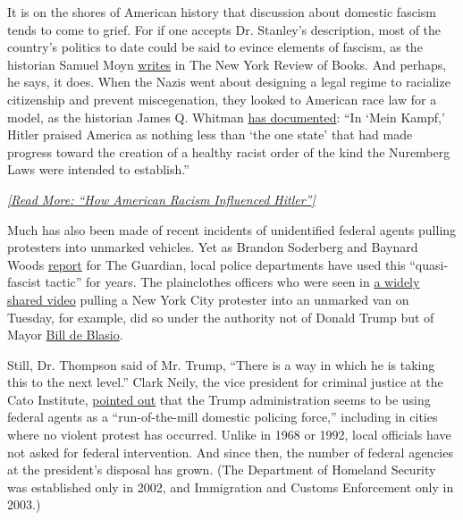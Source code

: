 It is on the shores of American history that discussion about domestic
fascism tends to come to grief. For if one accepts Dr. Stanley's
description, most of the country's politics to date could be said to
evince elements of fascism, as the historian Samuel Moyn
\href{https://www.nybooks.com/daily/2020/05/19/the-trouble-with-comparisons/}{writes}
in The New York Review of Books. And perhaps, he says, it does. When the
Nazis went about designing a legal regime to racialize citizenship and
prevent miscegenation, they looked to American race law for a model, as
the historian James Q. Whitman
\href{https://press.princeton.edu/books/hardcover/9780691172422/hitlers-american-model}{has
documented}: ``In `Mein Kampf,' Hitler praised America as nothing less
than `the one state' that had made progress toward the creation of a
healthy racist order of the kind the Nuremberg Laws were intended to
establish.''

\href{https://www.newyorker.com/magazine/2018/04/30/how-american-racism-influenced-hitler}{\emph{{[}Read
More: ``How American Racism Influenced Hitler''{]}}}

Much has also been made of recent incidents of unidentified federal
agents pulling protesters into unmarked vehicles. Yet as Brandon
Soderberg and Baynard Woods
\href{https://www.theguardian.com/commentisfree/2020/jul/29/think-the-federal-cops-in-portland-are-scary-police-use-these-tactics-all-the-time}{report}
for The Guardian, local police departments have used this
``quasi-fascist tactic'' for years. The plainclothes officers who were
seen in
\href{https://www.nytimes3xbfgragh.onion/2020/07/28/nyregion/nypd-protester-van.html}{a
widely shared video} pulling a New York City protester into an unmarked
van on Tuesday, for example, did so under the authority not of Donald
Trump but of Mayor
\href{https://gothamist.com/news/de-blasio-cops-dragging-protesters-into-unmarked-vans-is-the-kind-of-thing-we-dont-want-to-see}{Bill
de Blasio}.

Still, Dr. Thompson said of Mr. Trump, ``There is a way in which he is
taking this to the next level.'' Clark Neily, the vice president for
criminal justice at the Cato Institute,
\href{https://www.nytimes3xbfgragh.onion/2020/07/23/upshot/trump-portland.html}{pointed
out} that the Trump administration seems to be using federal agents as a
``run-of-the-mill domestic policing force,'' including in cities where
no violent protest has occurred. Unlike in 1968 or 1992, local officials
have not asked for federal intervention. And since then, the number of
federal agencies at the president's disposal has grown. (The Department
of Homeland Security was established only in 2002, and Immigration and
Customs Enforcement only in 2003.)

